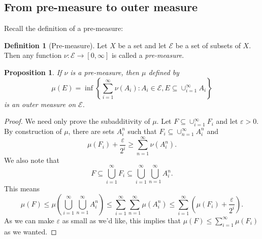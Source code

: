 \documentclass{article}
\newtheorem{proposition}[theorem]{Proposition}
\theoremstyle{definition}
\newtheorem{definition}[theorem]{Definition}
\begin{document}
\subsection{From pre-measure to outer measure}

Recall the definition of a pre-measure:

\begin{definition}[Pre-measure]
    Let \( X \) be a set and let \( \mathcal{E} \) be a set of subsets of \(
    X \). Then any function \( \nu : \mathcal{E} \to [0, \infty] \) is
    called a \emph{pre-measure}.
\end{definition}

\begin{proposition}
    If \( \nu \) is a pre-measure, then $\mu$ defined by 
    \begin{displaymath}
        \mu(E) = \inf \left\{ \sum_{i = 1}^{\infty} \nu(A_{i}) : A_{i}
        \in \mathcal{E}, E \subseteq \cup_{i = 1}^{\infty} A_{i}  \right\}
    \end{displaymath}
    is an outer measure on \( \mathcal{E} \).
\end{proposition}
\begin{proof}
    We need only prove the subadditivity of $\mu$. Let \( F \subseteq
    \cup_{i = 1}^{\infty} F_{i} \) and let \( \varepsilon > 0 \). By
    construction of \(\mu\), there are sets \( A_{i}^{n} \) such that \(
    F_{i} \subseteq \cup_{n = 1}^{\infty} A_{i}^{n} \) and
    \begin{displaymath}
        \mu(F_{i}) + \frac{\varepsilon}{2^{i}} \geq \sum_{n = 1}^{\infty}
        \nu(A_{i}^{n}).
    \end{displaymath}
    We also note that
    \begin{displaymath}
        F \subseteq \bigcup_{i = 1}^{\infty} F_{i} \subseteq\bigcup_{i =
        1}^{\infty} \bigcup_{n = 1}^{\infty} A_{i}^{n}.
    \end{displaymath}
    This means
    \begin{displaymath}
        \mu(F)
        \leq \mu\left(\bigcup_{i = 1}^{\infty} \bigcup_{n = 1}^{\infty}
        A_{i}^{n}\right)
        \leq \sum_{i = 1}^{\infty} \sum_{n = 1}^{\infty} \mu(A_{i}^{n})
        \leq \sum_{i = 1}^{\infty} \left( \mu(F_{i}) + \frac{\varepsilon}{2^{i}}
        \right).
    \end{displaymath}
    As we can make \(\varepsilon\) as small as we'd like, this implies that \(
    \mu(F) \leq \sum_{i = 1}^{\infty} \mu(F_{i}) \) as we wanted.
\end{proof}
\end{document}
